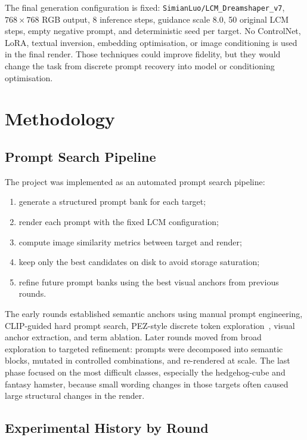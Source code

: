 \documentclass[runningheads]{llncs}
\newcommand{\modelname}{\texttt{SimianLuo/LCM\_Dreamshaper\_v7}}
\begin{document}
The final generation configuration is fixed: \modelname, $768\times768$ RGB output, 8 inference steps, guidance scale 8.0, 50 original LCM steps, empty negative prompt, and deterministic seed per target. No ControlNet, LoRA, textual inversion, embedding optimisation, or image conditioning is used in the final render. Those techniques could improve fidelity, but they would change the task from discrete prompt recovery into model or conditioning optimisation.

\section{Methodology}

\subsection{Prompt Search Pipeline}

The project was implemented as an automated prompt search pipeline:
\begin{enumerate}
  \item generate a structured prompt bank for each target;
  \item render each prompt with the fixed LCM configuration;
  \item compute image similarity metrics between target and render;
  \item keep only the best candidates on disk to avoid storage saturation;
  \item refine future prompt banks using the best visual anchors from previous rounds.
\end{enumerate}

The early rounds established semantic anchors using manual prompt engineering, CLIP-guided hard prompt search, PEZ-style discrete token exploration~\cite{pez}, visual anchor extraction, and term ablation. Later rounds moved from broad exploration to targeted refinement: prompts were decomposed into semantic blocks, mutated in controlled combinations, and re-rendered at scale. The last phase focused on the most difficult classes, especially the hedgehog-cube and fantasy hamster, because small wording changes in those targets often caused large structural changes in the render.

\subsection{Experimental History by Round}
\end{document}
